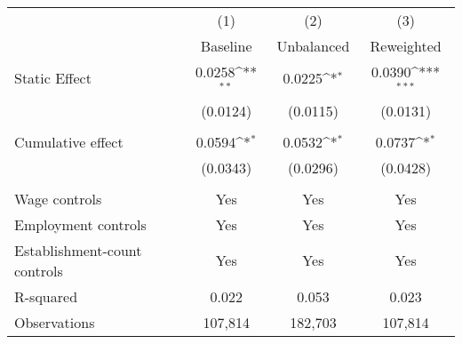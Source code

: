 {
\def\sym#1{\ifmmode^{#1}\else\(^{#1}\)\fi}
\begin{tabular}{l*{3}{c}}
\hline\hline
          &\multicolumn{1}{c}{(1)}&\multicolumn{1}{c}{(2)}&\multicolumn{1}{c}{(3)}\\
          &\multicolumn{1}{c}{Baseline}&\multicolumn{1}{c}{Unbalanced}&\multicolumn{1}{c}{Reweighted}\\
\hline
Static Effect&   0.0258\sym{**} &   0.0225\sym{*}  &   0.0390\sym{***}\\
          & (0.0124)         & (0.0115)         & (0.0131)         \\
\hline
\vspace{-2mm}&                  &                  &                  \\
Cumulative effect&0.0594\sym{*}         &0.0532\sym{*}         &0.0737\sym{*}         \\
          & (0.0343)         & (0.0296)         & (0.0428)         \\
\hline    &                  &                  &                  \\
Wage controls&      Yes         &      Yes         &      Yes         \\
Employment controls&      Yes         &      Yes         &      Yes         \\
Establishment-count controls&      Yes         &      Yes         &      Yes         \\
R-squared &    0.022         &    0.053         &    0.023         \\
Observations&  107,814         &  182,703         &  107,814         \\
\hline\hline
\end{tabular}
}
